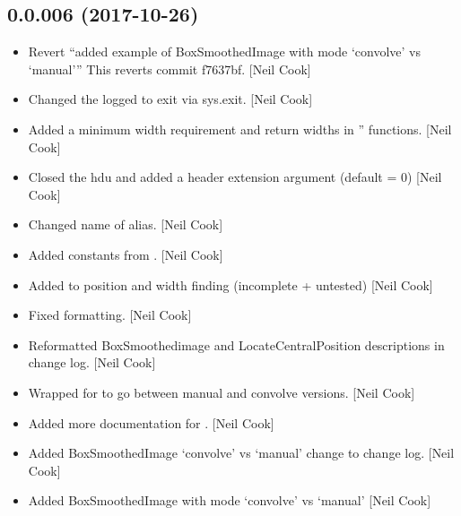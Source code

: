 \documentclass[a4paper,10pt,english]{report}
\begin{document}
\subsection{0.0.006 (2017-10-26)}
\label{\detokenize{misc/changelog:id545}}\begin{itemize}
\item {} 
Revert “added example of BoxSmoothedImage with mode ‘convolve’ vs
‘manual’” This reverts commit f7637bf. {[}Neil Cook{]}

\item {} 
Changed the logged to exit via sys.exit. {[}Neil Cook{]}

\item {} 
Added a minimum width requirement and return widths in
” functions. {[}Neil Cook{]}

\item {} 
Closed the hdu and added a header extension argument (default = 0)
{[}Neil Cook{]}

\item {} 
Changed name of  alias. {[}Neil Cook{]}

\item {} 
Added constants from . {[}Neil Cook{]}

\item {} 
Added to position and width finding (incomplete + untested) {[}Neil
Cook{]}

\item {} 
Fixed formatting. {[}Neil Cook{]}

\item {} 
Reformatted BoxSmoothedimage and LocateCentralPosition descriptions in
change log. {[}Neil Cook{]}

\item {} 
Wrapped for  to go between manual and convolve
versions. {[}Neil Cook{]}

\item {} 
Added more documentation for . {[}Neil Cook{]}

\item {} 
Added BoxSmoothedImage ‘convolve’ vs ‘manual’ change to change log.
{[}Neil Cook{]}

\item {} 
Added BoxSmoothedImage with mode ‘convolve’ vs ‘manual’ {[}Neil Cook{]}

\end{itemize}
\end{document}

